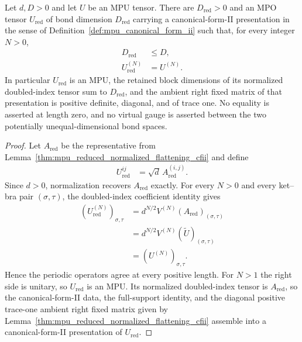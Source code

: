 \begin{lemma}
    \label{thm:mpu_reduced_cfii_representative}
    \leanok
    Let $d,D>0$ and let $U$ be an MPU tensor. There are
    $D_{\mathrm{red}}>0$ and an MPO tensor $U_{\mathrm{red}}$ of bond
    dimension $D_{\mathrm{red}}$ carrying a canonical-form-II presentation in
    the sense of Definition~\ref{def:mpu_canonical_form_ii} such that, for
    every integer $N>0$,
    \begin{align}
        D_{\mathrm{red}}       & \leq D,   \\
        U_{\mathrm{red}}^{(N)} & =U^{(N)}.
    \end{align}
    In particular $U_{\mathrm{red}}$ is an MPU, the retained block dimensions
    of its normalized doubled-index tensor sum to $D_{\mathrm{red}}$, and the
    ambient right fixed matrix of that presentation is positive definite,
    diagonal, and of trace one. No equality is asserted at length zero, and no
    virtual gauge is asserted between the two potentially unequal-dimensional
    bond spaces.
\end{lemma}

\begin{proof}\leanok
    Let $A_{\mathrm{red}}$ be the representative from Lemma~\ref{thm:mpu_reduced_normalized_flattening_cfii} and
    define
    \begin{align}
        U_{\mathrm{red}}^{ij}
         & =\sqrt d\,A_{\mathrm{red}}^{(i,j)}.
    \end{align}
    Since $d>0$, normalization recovers $A_{\mathrm{red}}$ exactly. For every
    $N>0$ and every ket--bra pair $(\sigma,\tau)$, the doubled-index
    coefficient identity gives
    \begin{align}
        (U_{\mathrm{red}}^{(N)})_{\sigma,\tau}
         & =d^{N/2}V^{(N)}(A_{\mathrm{red}})_{(\sigma,\tau)} \\
         & =d^{N/2}V^{(N)}(\widetilde U)_{(\sigma,\tau)}     \\
         & =(U^{(N)})_{\sigma,\tau}.
    \end{align}
    Hence the periodic operators agree at every positive length. For $N>1$
    the right side is unitary, so $U_{\mathrm{red}}$ is an MPU. Its normalized
    doubled-index tensor is $A_{\mathrm{red}}$, so the canonical-form-II data,
    the full-support identity, and the diagonal positive trace-one ambient
    right fixed matrix given by
    Lemma~\ref{thm:mpu_reduced_normalized_flattening_cfii} assemble into a
    canonical-form-II presentation of $U_{\mathrm{red}}$.
\end{proof}


